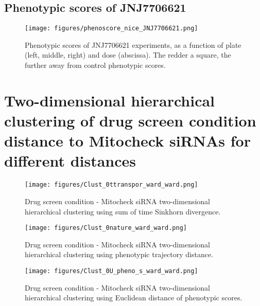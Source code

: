 \subsection{Phenotypic scores of JNJ7706621}
\label{sec:jnj}
\begin{figure*}[ht!]
\centerline{
\texttt{[image: figures/phenoscore\_nice\_JNJ7706621.png]}}
\caption{Phenotypic scores of JNJ7706621 experiments, as a function of plate (left, middle, right) and dose (abscissa). The redder a square, the further away from control phenotypic scores.}
\label{jnj}
\end{figure*}



\clearpage
\section{Two-dimensional hierarchical clustering of drug screen condition distance to Mitocheck siRNAs for different distances}
\label{heatmaps}

\begin{figure*}[ht!]
\centerline{\texttt{[image: figures/Clust\_0ttranspor\_ward\_ward.png]}
}
\caption{Drug screen condition - Mitocheck siRNA two-dimensional hierarchical clustering using sum of time Sinkhorn divergence.}
\label{cond_clust_ttransport}
\end{figure*}

\begin{figure*}[ht!]
\centerline{\texttt{[image: figures/Clust\_0nature\_ward\_ward.png]}
}
\caption{Drug screen condition - Mitocheck siRNA two-dimensional hierarchical clustering using phenotypic trajectory distance.}
\label{cond_clust_transport}
\end{figure*}

\begin{figure*}[ht!]
\centerline{\texttt{[image: figures/Clust\_0U\_pheno\_s\_ward\_ward.png]}
}
\caption{Drug screen condition - Mitocheck siRNA two-dimensional hierarchical clustering using Euclidean distance of phenotypic scores.}
\label{cond_clust_transport}
\end{figure*}



\clearpage
